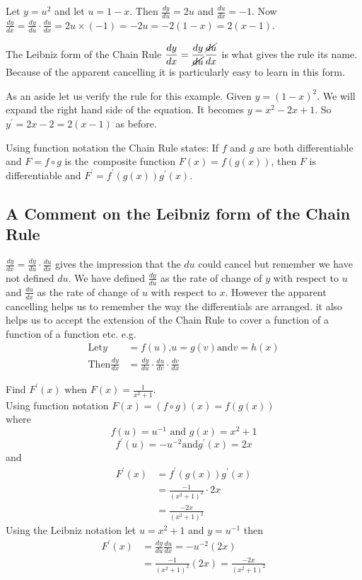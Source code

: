 Let
$y =u^{2}$ and let $u =1 -x$. Then $\frac{d y}{d u} =2 u$ and $\frac{d u}{d x} = -1$. Now $\frac{d y}{d x} =\frac{d y}{d u} \cdot \frac{d u}{d x} =2 u \times ( -1) = -2 u = -2 (1 -x) =2 (x -1)$. 

The Leibniz form of the Chain Rule $\displaystyle \frac{d y}{d x} =\frac{d y}{\cancel{d u}} \frac{\cancel{d u}}{d x}$ is what gives the rule its name. Because of the apparent cancelling it is particularly
easy to learn in this form. 

As an aside let us verify the rule for this example. Given
$y =(1 -x)^{2}$. We will expand the right hand side of the equation. It
becomes $y =x^{2} -2 x +1$. So $y^{ \prime } =2 x -2 =2 (x -1)$ as before. 

Using function notation the Chain Rule states: If $f$ and $g$ are both differentiable and $F =f \circ g$ is the\ composite function $F (x) =f (g (x))$, then $F$ is differentiable and $F^{ \prime } =f^{ \prime } (g (x)) g^{ \prime } (x)$. 

\subsection*{A Comment on the Leibniz form of the Chain Rule}
$\frac{d y}{d x} =\frac{d y}{d u} \cdot \frac{d u}{d x}$ gives the impression that the $d u$ could cancel but remember we have not defined $d u$. We have defined $\frac{d y}{d u}$ as the rate of change of $y$ with respect to $u$ and $\frac{d u}{d x}$ as the rate of change of $u$ with respect to $x$. However the apparent cancelling helps us to remember the way the differentials
are arranged. it also helps us to accept the extension of the Chain Rule to cover a function of a function of
a function etc. e.g.
\begin{align*}\text{Let}y &  = f (u)\text{,}u =g (v)\text{and}v =h (x) \\
\text{Then}\frac{d y}{d x} &  = \frac{d y}{d u} \cdot \frac{d u}{d v} \cdot \frac{d v}{d x}\end{align*}

\example Find $F^{ \prime } (x)$ when $F (x) =\frac{1}{x^{2} +1}$. \\
\solution Using function notation $F (x) =\left (f \circ g\right ) (x) =f (g (x))$ \\
where $$f (u) =u^{ -1} \text{ and }g (x) =x^{2} +1$$
\begin{equation*}f^{ \prime } (u) = -u^{ -2}\text{and}g^{ \prime } (x) =2 x
\end{equation*}
and 
\begin{align*}F^{ \prime } (x) &  = f^{ \prime } (g (x)) g^{ \prime } (x) \\
 &  = \frac{ -1}{(x^{2} +1)^{2}} \cdot 2 x \\
 &  = \frac{ -2 x}{\left (x^{2} +1\right )^{2}}\end{align*}
Using the Leibniz notation let $u =x^{2} +1$ and $y =u^{ -1}$ then
\begin{align*}F^{ \prime } (x) &  = \frac{d y}{d u} \frac{d u}{d x} = -u^{ -2} \left (2 x\right ) \\
 &  = \frac{ -1}{\left (x^{2} +1\right )^{2}} \left (2 x\right ) =\frac{ -2 x}{\left (x^{2} +1\right )^{2}}\end{align*}

